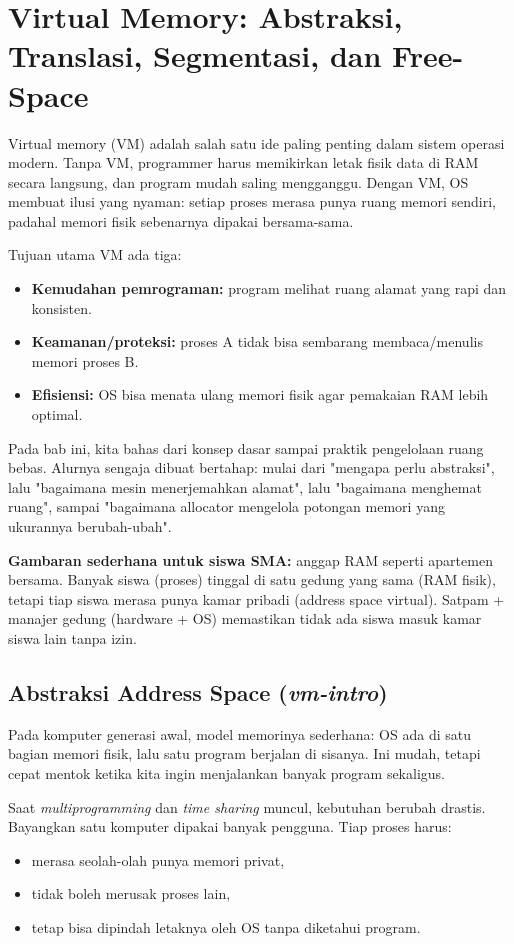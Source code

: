 \chapter{Virtual Memory: Abstraksi, Translasi, Segmentasi, dan Free-Space}
\vspace{1cm}

Virtual memory (VM) adalah salah satu ide paling penting dalam sistem operasi modern. Tanpa VM, programmer harus memikirkan letak fisik data di RAM secara langsung, dan program mudah saling mengganggu. Dengan VM, OS membuat ilusi yang nyaman: setiap proses merasa punya ruang memori sendiri, padahal memori fisik sebenarnya dipakai bersama-sama.

Tujuan utama VM ada tiga:
\begin{itemize}
    \item \textbf{Kemudahan pemrograman:} program melihat ruang alamat yang rapi dan konsisten.
    \item \textbf{Keamanan/proteksi:} proses A tidak bisa sembarang membaca/menulis memori proses B.
    \item \textbf{Efisiensi:} OS bisa menata ulang memori fisik agar pemakaian RAM lebih optimal.
\end{itemize}

Pada bab ini, kita bahas dari konsep dasar sampai praktik pengelolaan ruang bebas. Alurnya sengaja dibuat bertahap: mulai dari "mengapa perlu abstraksi", lalu "bagaimana mesin menerjemahkan alamat", lalu "bagaimana menghemat ruang", sampai "bagaimana allocator mengelola potongan memori yang ukurannya berubah-ubah".

\textbf{Gambaran sederhana untuk siswa SMA:}
anggap RAM seperti apartemen bersama. Banyak siswa (proses) tinggal di satu gedung yang sama (RAM fisik), tetapi tiap siswa merasa punya kamar pribadi (address space virtual). Satpam + manajer gedung (hardware + OS) memastikan tidak ada siswa masuk kamar siswa lain tanpa izin.

\section{Abstraksi Address Space (\textit{vm-intro})}
Pada komputer generasi awal, model memorinya sederhana: OS ada di satu bagian memori fisik, lalu satu program berjalan di sisanya. Ini mudah, tetapi cepat mentok ketika kita ingin menjalankan banyak program sekaligus.

Saat \textit{multiprogramming} dan \textit{time sharing} muncul, kebutuhan berubah drastis. Bayangkan satu komputer dipakai banyak pengguna. Tiap proses harus:
\begin{itemize}
    \item merasa seolah-olah punya memori privat,
    \item tidak boleh merusak proses lain,
    \item tetap bisa dipindah letaknya oleh OS tanpa diketahui program.
\end{itemize}

